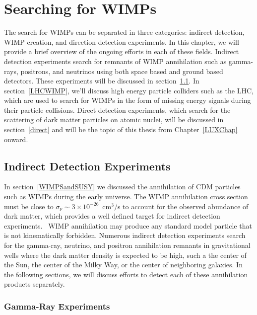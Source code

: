 \section{Searching for WIMPs} \label{Chapter2}

The search for WIMPs can be separated in three categories: indirect detection, WIMP creation, and direction detection experiments.  In this chapter, we will provide a brief overview of the ongoing efforts in each of these fields. Indirect detection experiments search for remnants of WIMP annihilation such as gamma-rays, positrons, and neutrinos using both space based and ground based detectors.  These experiments will be discussed in section~\ref{indi}. In section~\ref{LHCWIMP}, we'll discuss high energy particle colliders such as the LHC, which are used to search for WIMPs in the form of missing energy signals during their particle collisions.   Direct detection experiments, which search for the scattering of dark matter particles on atomic nuclei, will be discussed in section~\ref{direct} and will be the topic of this thesis from Chapter~\ref{LUXChap} onward. 

\subsection{Indirect Detection Experiments}\label{indi}

In section~\ref{WIMPSandSUSY} we discussed the annihilation of CDM particles such as WIMPs during the early universe.  The WIMP annihilation cross section must be close to $\sigma_\nu \sim 3\times 10^{-26}$~cm$^3$/s to account for the observed abundance of dark matter, which provides a well defined target for indirect detection experiments.~\cite{DMCross}  WIMP annihilation may produce any standard model particle that is not kinematically forbidden. Numerous indirect detection experiments search for the gamma-ray, neutrino, and positron annihilation remnants in gravitational wells where the dark matter density is expected to be high, such a the center of the Sun, the center of the Milky Way, or the center of neighboring galaxies.   In the following sections, we will discuss efforts to detect each of these annihilation products separately.

\subsubsection{Gamma-Ray Experiments}

